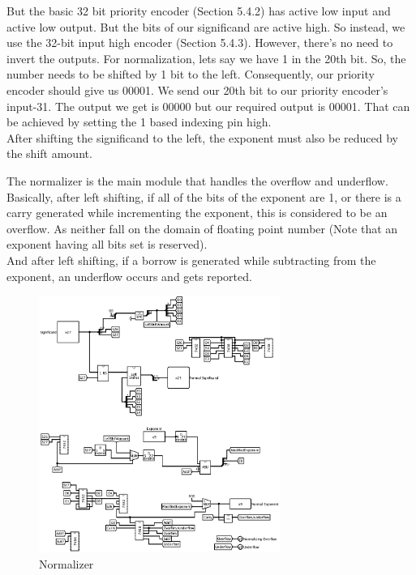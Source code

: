 \documentclass{article}
\begin{document}
But the basic 32 bit priority encoder (Section 5.4.2) has active low input and
active low output. But the bits of our significand are active high. So instead,
we use the 32-bit input high encoder (Section 5.4.3). However, there’s no need
to invert the outputs. For normalization, lets say we have 1 in the 20th bit. So,
the number needs to be shifted by 1 bit to the left. Consequently, our priority
encoder should give us 00001. We send our 20th bit to our priority encoder’s
input-31. The output we get is 00000 but our required output is 00001. That
can be achieved by setting the 1 based indexing pin high.
\\ 

After shifting the significand to the left, the exponent must also be reduced
by the shift amount.

The normalizer is the main module that handles the overflow and underflow.
Basically, after left shifting, if all of the bits of the exponent are 1, or there is
a carry generated while incrementing the exponent, this is considered to be an
overflow. As neither fall on the domain of floating point number (Note that an
exponent having all bits set is reserved).
\\ 

And after left shifting, if a borrow is generated while subtracting from the
exponent, an underflow occurs and gets reported.

\begin{figure}[h]
    \centering 
    \includegraphics[width = 0.7\textwidth]{normalizer}
    \caption{Normalizer}
\end{figure}
\pagebreak 
\end{document}

